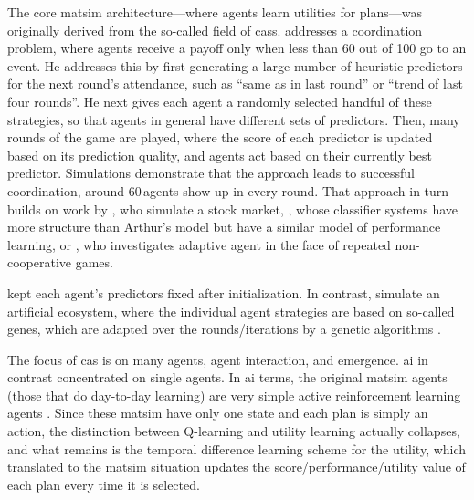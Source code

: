 







The core \gls{matsim} architecture---where agents learn utilities for plans---was originally derived from the so-called field of \glspl{cas}.  
%
\cite{ArthurBar} addresses a coordination problem, where agents receive a payoff only when less than 60 out of 100 go to an event.  He addresses this by first generating a large number of heuristic predictors for the next round's attendance, such as ``same as in last round'' or ``trend of last four rounds''.  He next gives each agent a randomly selected handful of these strategies, so that agents in general have different sets of predictors.  Then, many rounds of the game are played, where the score of each predictor is updated based on its prediction quality, and agents act based on their currently best predictor.  Simulations demonstrate that the approach leads to successful coordination, \ie around 60\,agents show up in every round.
%
That approach in turn builds on work by \cite{PalmerEtAl_PhysicaD_1994}, who simulate a stock market, \citet{Holland_1992}, whose classifier systems have more structure than Arthur's model but have a similar model of performance learning, or \cite{AxelrodBook}, who investigates adaptive agent in the face of repeated non-cooperative games.  

\citet{ArthurBar} kept each agent's predictors fixed after initialization.  In contrast,
\citet{HraberJonesForrestEcho} simulate an artificial ecosystem, where the individual agent strategies are based on so-called genes, which are adapted over the rounds/iterations by a genetic algorithms \citep{Goldberg_1989}.

The focus of \gls{cas} is on many agents, agent interaction, and emergence. \Gls{ai} in contrast concentrated on single agents. In \gls{ai} terms, the original \gls{matsim} agents (those that do day-to-day learning) are very simple active reinforcement learning agents \citep[][Chapter 21.3]{RusselNorvig2010ArtificialIntelligence}. Since these \gls{matsim} have only one state and each plan is simply an action, the distinction between Q-learning and utility learning actually collapses, and what remains is the temporal difference learning scheme for the utility, which translated to the \gls{matsim} situation updates the score/performance/utility value of each plan every time it is selected.

